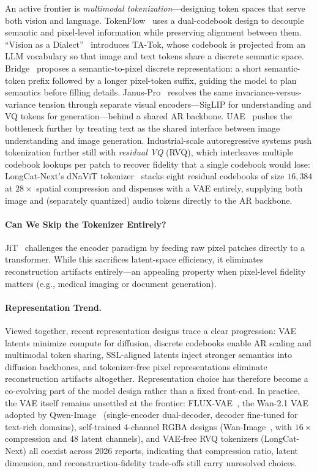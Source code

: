 \documentclass{llmxive}
\begin{document}
An active frontier is \emph{multimodal tokenization}---designing token spaces that serve both vision and language. TokenFlow~\citep{qu2024tokenflow} uses a dual-codebook design to decouple semantic and pixel-level information while preserving alignment between them. ``Vision as a Dialect''~\citep{han2025vision} introduces TA-Tok, whose codebook is projected from an LLM vocabulary so that image and text tokens share a discrete semantic space. Bridge~\citep{wang2025bridge} proposes a semantic-to-pixel discrete representation: a short semantic-token prefix followed by a longer pixel-token suffix, guiding the model to plan semantics before filling details. Janus-Pro~\citep{chen2025janusprounifiedmultimodalunderstanding} resolves the same invariance-versus-variance tension through separate visual encoders---SigLIP for understanding and VQ tokens for generation---behind a shared AR backbone. UAE~\citep{yan2025uae} pushes the bottleneck further by treating text as the shared interface between image understanding and image generation. Industrial-scale autoregressive systems push tokenization further still with \emph{residual VQ} (RVQ), which interleaves multiple codebook lookups per patch to recover fidelity that a single codebook would lose: LongCat-Next's dNaViT tokenizer~\citep{team2026longcat} stacks eight residual codebooks of size $16{,}384$ at $28\times$ spatial compression and dispenses with a VAE entirely, supplying both image and (separately quantized) audio tokens directly to the AR backbone.

\paragraph{Can We Skip the Tokenizer Entirely?}
JiT~\citep{li2025back} challenges the encoder paradigm by feeding raw pixel patches directly to a transformer. While this sacrifices latent-space efficiency, it eliminates reconstruction artifacts entirely---an appealing property when pixel-level fidelity matters (e.g., medical imaging or document generation).

\paragraph{Representation Trend.}
Viewed together, recent representation designs trace a clear progression: VAE latents minimize compute for diffusion, discrete codebooks enable AR scaling and multimodal token sharing, SSL-aligned latents inject stronger semantics into diffusion backbones, and tokenizer-free pixel representations eliminate reconstruction artifacts altogether. Representation choice has therefore become a co-evolving part of the model design rather than a fixed front-end. In practice, the VAE itself remains unsettled at the frontier: FLUX-VAE~\citep{labs2025flux1kontextflowmatching}, the Wan-2.1 VAE adopted by Qwen-Image~\citep{wu2025qwen} (single-encoder dual-decoder, decoder fine-tuned for text-rich domains), self-trained 4-channel RGBA designs (Wan-Image~\citep{mao2026wan}, with $16\times$ compression and 48 latent channels), and VAE-free RVQ tokenizers (LongCat-Next) all coexist across 2026 reports, indicating that compression ratio, latent dimension, and reconstruction-fidelity trade-offs still carry unresolved choices.
\end{document}

